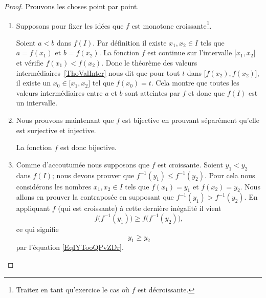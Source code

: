 \begin{proof}

    Prouvons les choses point par point.

    \begin{enumerate}
    \item

        Supposons pour fixer les idées que \( f\) est monotone croissante\footnote{Traitez en tant qu'exercice le cas où $ f$ est décroissante.}.

        Soient \( a< b\) dans \( f(I)\). Par définition il existe \( x_1,x_2\in I\) tels que \( a=f(x_1)\) et \( b=f(x_2)\). La fonction \( f\) est continue sur l'intervalle \( \mathopen[ x_1 , x_2 \mathclose]\) et vérifie \( f(x_1)<f(x_2)\). Donc le théorème des valeurs intermédiaires~\ref{ThoValInter} nous dit que pour tout \( t\) dans \( \mathopen[ f(x_2) , f(x_2) \mathclose]\), il existe un \( x_0\in\mathopen[ x_1 , x_2 \mathclose]\) tel que \( f(x_0)=t\). Cela montre que toutes les valeurs intermédiaires entre \( a\) et \( b\) sont atteintes par \( f\) et donc que \( f(I)\) est un intervalle.

    \item

    Nous prouvons maintenant que \( f\) est bijective en prouvant séparément qu'elle est surjective et injective.


    La fonction \( f\) est donc bijective.

\item

    Comme d'accoutumée nous supposons que \( f\) est croissante. Soient \( y_1<y_2\) dans \( f(I)\); nous devons prouver que \( f^{-1}(y_1)\leq f^{-1}(y_2)\). Pour cela nous considérons les nombres \( x_1,x_2\in I\) tels que \( f(x_1)=y_1\) et \( f(x_2)=y_2\). Nous allons en prouver la contraposée en supposant que \( f^{-1}(y_1)>f^{-1}(y_2)\). En appliquant \( f\) (qui est croissante) à cette dernière inégalité il vient
    \begin{equation}
        f\big( f^{-1}(y_1) \big)\geq f\big( f^{-1}(y_2) \big),
    \end{equation}
    ce qui signifie
    \begin{equation}
        y_1\geq y_2
    \end{equation}
    par l'équation \eqref{EqIYTooQPvZDr}.


\end{enumerate}
\end{proof}
